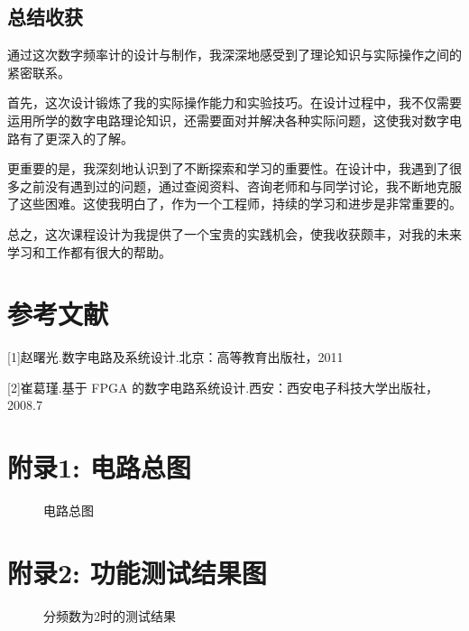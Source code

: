 \documentclass[UTF8,titlepage,a4paper]{ctexart}
\numberwithin{figure}{section}
\begin{document}
\subsection{总结收获}
通过这次数字频率计的设计与制作，我深深地感受到了理论知识与实际操作之间的紧密联系。

首先，这次设计锻炼了我的实际操作能力和实验技巧。在设计过程中，我不仅需要运用所学的数字电路理论知识，还需要面对并解决各种实际问题，这使我对数字电路有了更深入的了解。

更重要的是，我深刻地认识到了不断探索和学习的重要性。在设计中，我遇到了很多之前没有遇到过的问题，通过查阅资料、咨询老师和与同学讨论，我不断地克服了这些困难。这使我明白了，作为一个工程师，持续的学习和进步是非常重要的。

总之，这次课程设计为我提供了一个宝贵的实践机会，使我收获颇丰，对我的未来学习和工作都有很大的帮助。

\section*{参考文献}

[1]赵曙光.数字电路及系统设计.北京：高等教育出版社，2011

[2]崔葛瑾.基于 FPGA 的数字电路系统设计.西安：西安电子科技大学出版社，2008.7

\clearpage

\section*{附录1: 电路总图}
\begin{figure}[H]
\centering
 \caption{电路总图}
 \label{}
\end{figure}

\section*{附录2: 功能测试结果图}

\begin{figure}[H]
\centering
 \caption{分频数为2时的测试结果}
 \label{}
\end{figure}
\end{document}
